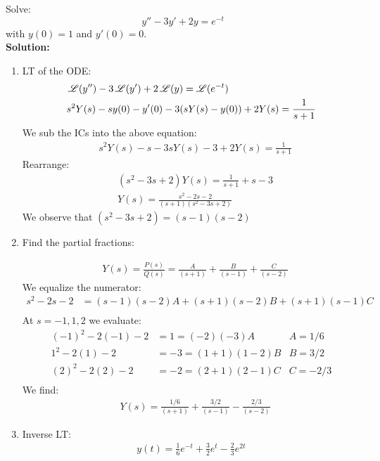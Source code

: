 \begin{exmp}{}
Solve:
\begin{equation*}
y''-3y'+2y=e^{-t}
\end{equation*}
with $y(0)=1$ and $y'(0)=0$.\\
\textbf{Solution:}\\
\begin{enumerate}
\item LT of the ODE:\\
\begin{align*}
&\operatorname{\mathscr{L}}(y'')-3\operatorname{\mathscr{L}}(y')+2\operatorname{\mathscr{L}}(y)=\operatorname{\mathscr{L}}(e^{-t})\\
&s^2Y(s)-sy(0)-y'(0) -3(sY(s)-y(0))+2Y(s)=\frac{1}{s+1}
\end{align*}
We sub the ICs into the above equation:
\begin{align*}
&s^2Y(s)-s -3sY(s)-3+2Y(s)=\frac{1}{s+1}
\end{align*}
Rearrange:
\begin{align*}
&(s^2-3s+2)Y(s)=\frac{1}{s+1}+s-3\\
&Y(s)=\frac{s^2-2s-2}{(s+1)(s^2-3s+2)}
\end{align*}
We observe that $(s^2-3s+2)=(s-1)(s-2)$
\item Find the partial fractions:

\begin{align*}
&Y(s)=\frac{P(s)}{Q(s)}=\frac{A}{(s+1)}+\frac{B}{(s-1)}+\frac{C}{(s-2)}
\end{align*}
We equalize the numerator:
\begin{align*}
s^2-2s-2&=(s-1)(s-2)A+(s+1)(s-2)B+(s+1)(s-1)C\\
\end{align*}
At $s=-1,1,2$ we evaluate:
\begin{align*}
(-1)^2-2(-1)-2&=1=(-2)(-3)A \qquad &A=1/6\\
1^2-2(1)-2&=-3=(1+1)(1-2)B &B=3/2\\
(2)^2-2(2)-2&=-2=(2+1)(2-1)C &C=-2/3\\
\end{align*}
We find:
\begin{align*}
&Y(s)=\frac{1/6}{(s+1)}+\frac{3/2}{(s-1)}-\frac{2/3}{(s-2)}
\end{align*}
\item Inverse LT:
\begin{align*}
\boxed{y(t)=\frac{1}{6}e^{-t}+\frac{3}{2}e^{t}-\frac{2}{3}e^{2t}}
\end{align*}
\end{enumerate}
\end{exmp}
